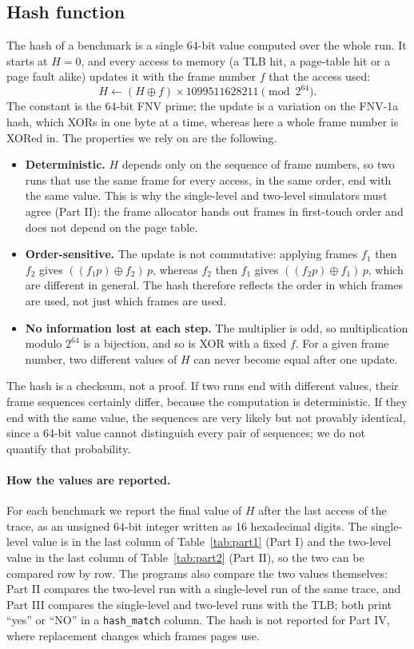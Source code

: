 \documentclass[11pt,a4paper]{article}
\begin{document}
\subsection{Hash function}
The hash of a benchmark is a single 64-bit value computed over the whole run. It starts at $H=0$, and every access to memory (a TLB hit, a page-table hit or a page fault alike) updates it with the frame number $f$ that the access used:
\[
H \leftarrow (H \oplus f) \times 1099511628211 \pmod{2^{64}}.
\]
The constant is the 64-bit FNV prime; the update is a variation on the FNV-1a hash, which XORs in one byte at a time, whereas here a whole frame number is XORed in. The properties we rely on are the following.
\begin{itemize}
\item \textbf{Deterministic.} $H$ depends only on the sequence of frame numbers, so two runs that use the same frame for every access, in the same order, end with the same value. This is why the single-level and two-level simulators must agree (Part II): the frame allocator hands out frames in first-touch order and does not depend on the page table.
\item \textbf{Order-sensitive.} The update is not commutative: applying frames $f_1$ then $f_2$ gives $((f_1 p) \oplus f_2)\,p$, whereas $f_2$ then $f_1$ gives $((f_2 p) \oplus f_1)\,p$, which are different in general. The hash therefore reflects the order in which frames are used, not just which frames are used.
\item \textbf{No information lost at each step.} The multiplier is odd, so multiplication modulo $2^{64}$ is a bijection, and so is XOR with a fixed $f$. For a given frame number, two different values of $H$ can never become equal after one update.
\end{itemize}
The hash is a checksum, not a proof. If two runs end with different values, their frame sequences certainly differ, because the computation is deterministic. If they end with the same value, the sequences are very likely but not provably identical, since a 64-bit value cannot distinguish every pair of sequences; we do not quantify that probability.

\paragraph{How the values are reported.} For each benchmark we report the final value of $H$ after the last access of the trace, as an unsigned 64-bit integer written as 16 hexadecimal digits. The single-level value is in the last column of Table~\ref{tab:part1} (Part I) and the two-level value in the last column of Table~\ref{tab:part2} (Part II), so the two can be compared row by row. The programs also compare the two values themselves: Part II compares the two-level run with a single-level run of the same trace, and Part III compares the single-level and two-level runs with the TLB; both print ``yes'' or ``NO'' in a \texttt{hash\_match} column. The hash is not reported for Part IV, where replacement changes which frames pages use.
\end{document}
